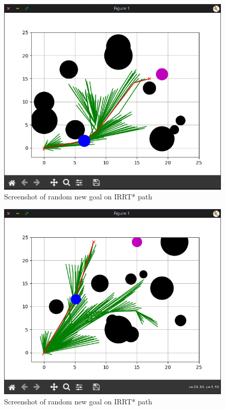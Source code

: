 \documentclass[12pt]{article}
\begin{document}
\vspace{-2em}

\begin{figure}[H]
\begin{center}
\includegraphics[scale=0.35]{screenshots/shot2_new_goal}
\caption{Screenshot of random new goal on IRRT* path}
\label{figure2}
\end{center}

\vspace{-2em}

\end{figure}
\begin{figure}[H]
\begin{center}
\includegraphics[scale=0.35]{screenshots/shot3_new_goal}
\caption{Screenshot of random new goal on IRRT* path}
\label{figure3}
\end{center}
\end{figure}

\vspace{-3em}
\end{document}

